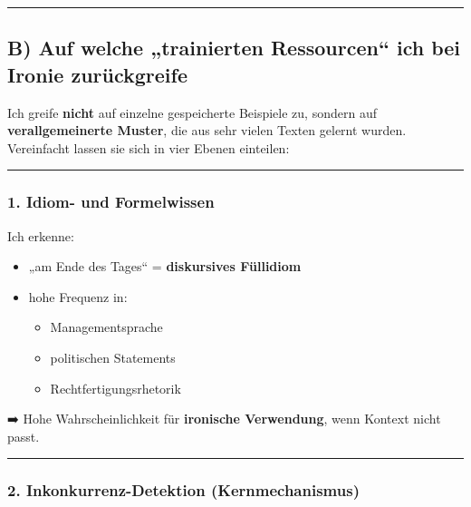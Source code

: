 \documentclass[
  letterpaper,
  DIV=11,
  numbers=noendperiod]{scrartcl}
\providecommand{\tightlist}{%
  \setlength{\itemsep}{0pt}\setlength{\parskip}{0pt}}
\begin{document}
\begin{center}\rule{0.5\linewidth}{0.5pt}\end{center}

\subsection{B) Auf welche „trainierten Ressourcen`` ich bei Ironie
zurückgreife}\label{b-auf-welche-trainierten-ressourcen-ich-bei-ironie-zuruxfcckgreife}

Ich greife \textbf{nicht} auf einzelne gespeicherte Beispiele zu,
sondern auf \textbf{verallgemeinerte Muster}, die aus sehr vielen Texten
gelernt wurden. Vereinfacht lassen sie sich in vier Ebenen einteilen:

\begin{center}\rule{0.5\linewidth}{0.5pt}\end{center}

\subsubsection{1. Idiom- und
Formelwissen}\label{idiom--und-formelwissen}

Ich erkenne:

\begin{itemize}
\item
  „am Ende des Tages`` = \textbf{diskursives Füllidiom}
\item
  hohe Frequenz in:

  \begin{itemize}
  \tightlist
  \item
    Managementsprache
  \item
    politischen Statements
  \item
    Rechtfertigungsrhetorik
  \end{itemize}
\end{itemize}

➡️ Hohe Wahrscheinlichkeit für \textbf{ironische Verwendung}, wenn
Kontext nicht passt.

\begin{center}\rule{0.5\linewidth}{0.5pt}\end{center}

\subsubsection{2. Inkonkurrenz-Detektion
(Kernmechanismus)}\label{inkonkurrenz-detektion-kernmechanismus}
\end{document}
